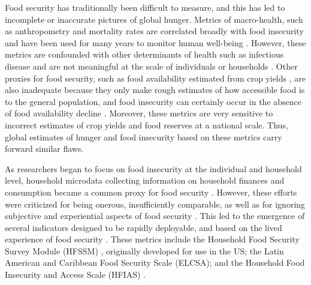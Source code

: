 \documentclass{article}
\begin{document}
Food security has traditionally been difficult to measure, and this has led to incomplete or inaccurate pictures of global hunger.  Metrics of macro-health, such as anthropometry and mortality rates are correlated broadly with food insecurity and have been used for many years to monitor human well-being \citep{Puffer1973, Habicht1974}.  However, these metrics are confounded with other determinants of health such as infectious disease and are not meaningful at the scale of individuals or households \citep{Perumal2018}.  Other proxies for food security, such as food availability estimated from crop yields \citep{Maxwell1992}, are also inadequate because they only make rough estimates of how accessible food is to the general population, and food insecurity can certainly occur in the absence of food availability decline \citep{Sen1983}.  Moreover, these metrics are very sensitive to incorrect estimates of crop yields and food reserves at a national scale.  Thus, global estimates of hunger and food insecurity based on these metrics carry forward similar flaws.

As researchers began to focus on food insecurity at the individual and household level, household microdata collecting information on household finances and consumption became a common proxy for food security \citep{Haddad1994}.  However, these efforts were criticized for being onerous, insufficiently comparable, as well as for ignoring subjective and experiential aspects of food security \citep{Maxwell1996}.  This led to the emergence of several indicators designed to be rapidly deployable, and based on the lived experience of food security \citep{Jones2013}.  These metrics include the Household Food Security Survey Module (HFSSM) \citep{kennedy2005keynote}, originally developed for use in the US; the Latin American and Caribbean Food Security Scale (ELCSA); and the Household Food Insecurity and Access Scale (HFIAS) \citep{Coates2007}.
\end{document}
